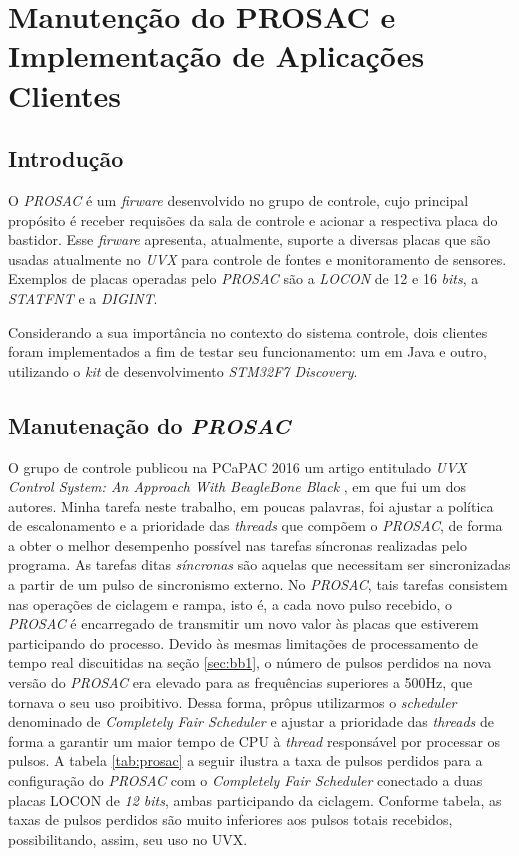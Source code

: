 \section {Manutenção do PROSAC e Implementação de Aplicações Clientes}

\subsection{Introdução}

O \textit{PROSAC} é um \textit{firware} desenvolvido no grupo de controle, cujo
principal propósito é receber requisões da sala de controle e acionar a
respectiva placa do bastidor. Esse \textit{firware} apresenta, atualmente,
suporte a diversas placas que são usadas atualmente no \textit{UVX} para
controle de fontes e monitoramento de sensores. Exemplos de placas operadas pelo
\textit{PROSAC} são a \textit{LOCON} de 12 e 16 \textit{bits}, a
\textit{STATFNT} e a \textit{DIGINT}.

\vspace{12px}

Considerando a sua importância no contexto do sistema controle, dois clientes
foram implementados a fim de testar seu funcionamento: um em Java e outro,
utilizando o \textit{kit} de desenvolvimento \textit{STM32F7 Discovery}.

\subsection {Manutenação do \textit{PROSAC}}

O grupo de controle publicou na PCaPAC 2016 um artigo entitulado \textit{UVX
Control System: An Approach With BeagleBone Black} \cite{pcapac2016}, em que fui
um dos autores. Minha tarefa neste trabalho, em poucas palavras, foi ajustar a
política de escalonamento e a prioridade das \textit{threads} que compõem o
\textit{PROSAC}, de forma a obter o melhor desempenho possível nas tarefas
síncronas realizadas pelo programa. As tarefas ditas \textit{síncronas}
são aquelas que necessitam ser sincronizadas a partir de um pulso de sincronismo
externo. No \textit{PROSAC}, tais tarefas consistem nas operações de ciclagem e
rampa, isto é, a cada novo pulso recebido, o \textit{PROSAC} é encarregado de
transmitir um novo valor às placas que estiverem participando do processo.
Devido às mesmas limitações de processamento de tempo real discuitidas na seção
\ref{sec:bb1}, o número de pulsos perdidos na nova versão do \textit{PROSAC} era
elevado para as frequências superiores a 500Hz, que tornava o seu uso
proibitivo. Dessa forma, prôpus utilizarmos o \textit{scheduler} denominado de
\textit{Completely Fair Scheduler} e ajustar a prioridade das \textit{threads}
de forma a garantir um maior tempo de CPU à \textit{thread} responsável por
processar os pulsos. A tabela \ref{tab:prosac} a seguir ilustra a taxa de pulsos
perdidos para a configuração do \textit{PROSAC} com o \textit{Completely Fair
Scheduler} conectado a duas placas LOCON de \textit{12 bits}, ambas
participando da ciclagem. Conforme tabela, as taxas de pulsos perdidos são muito
inferiores aos pulsos totais recebidos, possibilitando, assim, seu uso no UVX.

